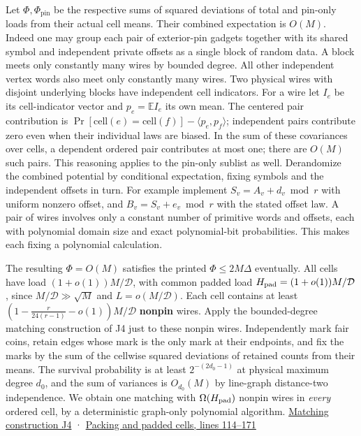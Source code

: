 \documentclass[11pt,a4paper]{article}
\begin{document}
Let \(\Phi,\Phi_{\mathrm{pin}}\) be the respective sums of squared
deviations of total and pin-only loads from their actual cell means.
Their combined expectation is \(O(M)\). Indeed one may group each pair
of exterior-pin gadgets together with its shared symbol and independent
private offsets as a single block of random data. A block meets only
constantly many wires by bounded degree. All other independent vertex
words also meet only constantly many wires. Two physical wires with
disjoint underlying blocks have independent cell indicators. For a wire
let \(I_e\) be its cell-indicator vector and \(p_e=\mathbb E I_e\) its
own mean. The centered pair contribution is
\(\Pr[\mathrm{cell}(e)=\mathrm{cell}(f)]-\langle p_e,p_f\rangle\);
independent pairs contribute zero even when their individual laws are
biased. In the sum of these covariances over cells, a dependent ordered
pair contributes at most one; there are \(O(M)\) such pairs. This
reasoning applies to the pin-only sublist as well. Derandomize the
combined potential by conditional expectation, fixing symbols and the
independent offsets in turn. For example implement
\(S_v=A_v+d_v\bmod r\) with uniform nonzero offset, and
\(B_v=S_v+e_v\bmod r\) with the stated offset law. A pair of wires
involves only a constant number of primitive words and offsets, each
with polynomial domain size and exact polynomial-bit probabilities. This
makes each fixing a polynomial calculation.

The resulting \(\Phi=O(M)\) satisfies the printed \(\Phi\le 2M\Delta\)
eventually. All cells have load \((1+o(1))M/\mathcal D\), with common
padded load \(H_{\rm pad}=(1+o(1))M/\mathcal D\), since
\(M/\mathcal D\gg\sqrt M\) and \(L=o(M/\mathcal D)\). Each cell contains
at least \((1-\frac{r}{24(r-1)}-o(1))M/\mathcal D\) \textbf{nonpin}
wires. Apply the bounded-degree matching construction of J4 just to
these nonpin wires. Independently mark fair coins, retain edges whose
mark is the only mark at their endpoints, and fix the marks by the sum
of the cellwise squared deviations of retained counts from their means.
The survival probability is at least \(2^{-(2d_0-1)}\) at physical
maximum degree \(d_0\), and the sum of variances is \(O_{d_0}(M)\) by
line-graph distance-two independence. We obtain one matching with
\(\Omega(H_{\rm pad})\) nonpin wires in \emph{every} ordered cell, by a
deterministic graph-only polynomial algorithm.
\hyperref[v9-section-joint-algorithms]{Matching construction J4} ·
\href{https://github.com/openai/math/blob/main/preprints/The-Exponential-Time-Hypothesis-is-False-October-25-2026/build/quantitative-contraction.tex\#L114}{Packing
and padded cells, lines 114--171}
\end{document}
